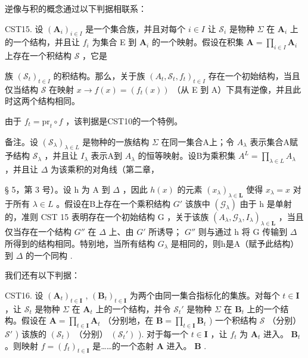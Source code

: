 逆像与积的概念通过以下判据相联系：

CST15. 设 \((\mathbf{A}_i)_{i\in I}\) 是一个集合族，并且对每个 \(i\in I\) 让 \(\mathcal{S}_i\) 是物种 \(\Sigma\) 在 \(\mathbf{A}_i\) 上的一个结构，并且让 \(f_i\) 为集合 E 到 \(\mathbf{A}_i\) 的一个映射。假设在积集 \(\mathbf{A} = \prod_{i\in I}\mathbf{A}_i\) 上存在一个积结构 \(\mathcal{S}\) ，它是

族 \((\mathcal{S}_t)_{t\in I}\) 的积结构。那么，关于族 \((A_t,\mathcal{S}_t,f_t)_{t\in I}\) 存在一个初始结构，当且仅当结构 \(\mathcal{S}\) 在映射 \(x\to f(x) = (f_t(x))\) （从 E 到 A）下具有逆像，并且此时这两个结构相同。

由于 \(f_{t} = \mathrm{pr}_{t} \circ f\) ，该判据是CST10的一个特例。

备注。设 \((\mathcal{S}_{\lambda})_{\lambda \in L}\) 是物种的一族结构 \(\Sigma\) 在同一集合A上；令 \(A_{\lambda}\) 表示集合A赋予结构 \(\mathcal{S}_{\lambda}\) ，并且让 \(I_{\lambda}\) 表示A到 \(A_{\lambda}\) 的恒等映射。设B为乘积集 \(A^{L} = \prod_{\lambda \in L} A_{\lambda}\) ，并且让 \(\Delta\) 为该乘积的对角线（第二章，

§ 5，第 3 号）。设 h 为 A 到 \(\Delta\) ，因此 \(h(x)\) 的元素 \((x_{\lambda})_{\lambda\in\mathbf{L}}\) 使得 \(x_{\lambda}=x\) 对于所有 \(\lambda\in L\) 。假设在B上存在一个乘积结构 \(G'\) 该族中 \((\mathcal{G}_{\lambda})\) 由于 h 是单射的，准则 CST 15 表明存在一个初始结构 G ，关于该族 \((A_{\lambda},\mathcal{G}_{\lambda},I_{\lambda})_{\lambda\in\mathbf{L}}\) ，当且仅当存在一个结构 \(G''\) 在 \(\Delta\) 上、由 \(G'\) 所诱导； \(G''\) 则与通过 h 将 G 传输到 \(\Delta\) 所得到的结构相同。特别地，当所有结构 \(G_{\lambda}\) 是相同的，则h是A（赋予此结构）到 \(\Delta\) 的一个同构 .

我们还有以下判据：

CST16. 设 \((\mathbf{A}_t)_{t \in \mathbf{I}}\) , \((\mathbf{B}_t)_{t \in \mathbf{I}}\) 为两个由同一集合指标化的集族。对每个 \(t \in \mathbf{I}\) ，让 \(\mathcal{S}_t\) 是物种 \(\Sigma\) 在 \(\mathbf{A}_t\) 上的一个结构，并令 \(\mathcal{S}_t'\) 是物种 \(\Sigma\) 在 \(\mathbf{B}_t\) 上的一个结构。假设在 \(\mathbf{A} = \prod_{t \in \mathbf{I}} \mathbf{A}_t\) （分别地，在 \(\mathbf{B} = \prod_{t \in \mathbf{I}} \mathbf{B}_t\) ) 一个积结构 \(\mathcal{S}\) （分别） \(\mathcal{S}'\) ) 该族的 \((\mathcal{S}_t)\) （分别） \((\mathcal{S}_t')\) ). 对于每一个 \(t \in \mathbf{I}\) ，让 \(f_t\) 为 \(\mathbf{A}_t\) 进入。 \(\mathbf{B}_t\) 。则映射 \(f = (f_t)_{t \in \mathbf{I}}\) 是……的一个态射 \(\mathbf{A}\) 进入。 \(\mathbf{B}\) .

